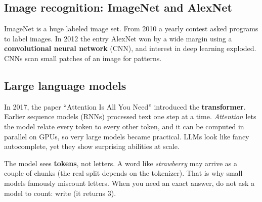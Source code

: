 \subsection{Image recognition: ImageNet and AlexNet}

ImageNet is a huge labeled image set. From 2010 a yearly contest asked programs to label images.
In 2012 the entry AlexNet won by a wide margin using a \textbf{convolutional neural network}
(CNN), and interest in deep learning exploded. CNNs scan small patches of an image for patterns.

\subsection{Large language models}

In 2017, the paper ``Attention Is All You Need'' introduced the \textbf{transformer}. Earlier
sequence models (RNNs) processed text one step at a time. \emph{Attention} lets the model relate
every token to every other token, and it can be computed in parallel on GPUs, so very large models
became practical. LLMs look like fancy autocomplete, yet they show surprising abilities at scale.

\begin{center}
\end{center}

\begin{trap}
The model sees \textbf{tokens}, not letters. A word like \emph{strawberry} may arrive as a couple of
chunks (the real split depends on the tokenizer). That is why small models famously miscount
letters. When you need an exact answer, do not ask a model to count: write 
(it returns 3).
\end{trap}

